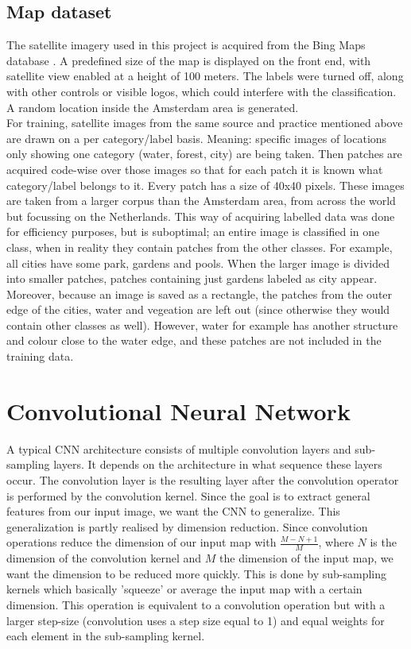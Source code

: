 \documentclass[a4paper,onecolumn]{report}
\begin{document}
\section{Map dataset}
The satellite imagery used in this project is acquired from the Bing Maps database \cite{bing}. A predefined size of the map is displayed on the front end, with satellite view enabled at a height of 100 meters. The labels were turned off, along with other controls or visible logos, which could interfere with the classification.  A random location inside the Amsterdam area is generated.\\

For training, satellite images from the same source and practice mentioned above are drawn on a per category/label basis. Meaning: specific images of locations only showing one category (water, forest, city) are being taken. Then patches are acquired code-wise over those images so that for each patch it is known what category/label belongs to it. Every patch has a size of 40x40 pixels. These images are taken from a larger corpus than the Amsterdam area, from across the world but focussing on the Netherlands. This way of acquiring labelled data was done for efficiency purposes, but is suboptimal; an entire image is classified in one class, when in reality they contain patches from the other classes. For example, all cities have some park, gardens and pools. When the larger image is divided into smaller patches, patches containing just gardens labeled as city appear. Moreover, because an image is saved as a rectangle, the patches from the outer edge of the cities, water and vegeation are left out (since otherwise they would contain other classes as well). However, water for example has another structure and colour close to the water edge, and these patches are not included in the training data. 

\chapter{Convolutional Neural Network}
\label{chap:CNN}
A typical CNN architecture consists of multiple convolution layers and sub-sampling layers. It depends on the architecture in what sequence these layers occur. The convolution layer is the resulting layer after the convolution operator is performed by the convolution kernel. Since the goal is to extract general features from our input image, we want the CNN to generalize. This generalization is partly realised by dimension reduction. Since convolution operations reduce the dimension of our input map with $\frac{M-N+1}{M}$, where $N$ is the dimension of the convolution kernel and $M$ the dimension of the input map, we want the dimension to be reduced more quickly. This is done by sub-sampling kernels which basically 'squeeze' or average the input map with a certain dimension. This operation is equivalent to a convolution operation but with a larger step-size (convolution uses a step size equal to 1) and equal weights for each element in the sub-sampling kernel.
\end{document}
